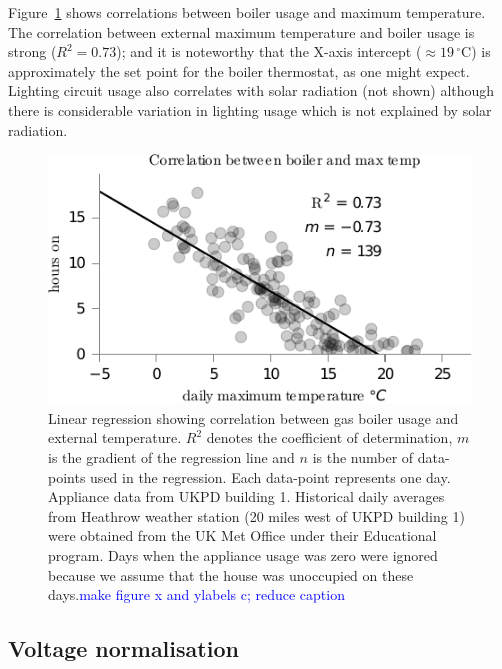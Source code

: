 \documentclass{sig-alternate}
\newcommand{\bluecolor}[1]{\textcolor{blue}{#1}}
\begin{document}
Figure~\ref{fig:weather_correlations} shows correlations between
boiler usage and maximum temperature.  The correlation between
external maximum temperature and boiler usage is strong ($R^2=0.73$); and it is
noteworthy that the X-axis intercept ($\approx19\,^{\circ}\mathrm{C}$)
is approximately the set point for the boiler thermostat, as one might
expect.  Lighting circuit usage also correlates with solar radiation
(not shown) although there is considerable variation in lighting usage
which is not explained by solar radiation.

\begin{figure}[!t]
  \centering
  \includegraphics[width=\columnwidth]{figures/weather_correlations2.pdf} 
  \caption{Linear regression showing correlation between gas boiler
    usage and external temperature. $R^2$ denotes the coefficient of
    determination, $m$ is the gradient of the regression line and $n$
    is the number of data-points used in the regression.  Each
    data-point represents one day.  Appliance
    data from UKPD building 1.  Historical daily averages from
    Heathrow weather station (20 miles west of UKPD building 1) were
    obtained from the UK Met Office under their Educational program.
    Days when the appliance usage was zero were ignored because
    we assume that the house was unoccupied on these days.\bluecolor{make figure x and ylabels c; reduce caption}}
  \label{fig:weather_correlations} 
\end{figure}

\subsection{Voltage normalisation} %
\end{document}
